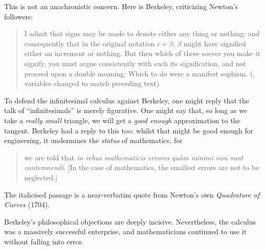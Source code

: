 \documentclass[../../../include/open-logic-section]{subfiles}
\begin{document}
This is not an anachronistic concern. Here is Berkeley, criticizing
Newton's followers:
\begin{quote}
I admit that signs may be made to denote either any thing or nothing:
and consequently that in the original notation $c + \beta$, $\beta$
might have signified either an increment or nothing. But then which of
these soever you make it signify, you must argue consistently with
such its signification, and not proceed upon a double meaning: Which
to do were a manifest sophism. (\cite[\S{}XIII]{Berkeley1734},
variables changed to match preceding text)
\end{quote}
To defend the infinitesimal calculus against Berkeley, one might reply
that the talk of ``infinitesimals'' is merely figurative. One might
say that, so long as we take a \emph{really small} triangle, we will
get a \emph{good enough} approximation to the tangent. Berkeley had a
reply to this too: whilst that might be good enough for engineering,
it undermines the \emph{status} of mathematics,  for
\begin{quote}
we are told that \emph{in rebus mathematicis errores qu\`{a}m minimi
non sunt contemnendi}. [In the case of mathematics, the smallest
errors are not to be neglected.] \cite[\S{}IX]{Berkeley1734}
\end{quote}
The italicised passage is a near-verbatim quote from Newton's own
\emph{Quadrature of Curves} (1704). 

Berkeley's philosophical objections are deeply incisive. Nevertheless,
the calculus was a massively successful enterprise, and mathematicians
continued to use it without falling into error.
\end{document}
